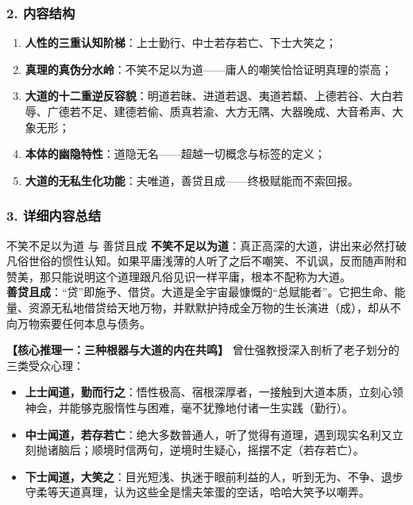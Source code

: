 \subsubsection{2. 内容结构}
\begin{enumerate}
    \item \textbf{人性的三重认知阶梯}：上士勤行、中士若存若亡、下士大笑之；
    \item \textbf{真理的真伪分水岭}：不笑不足以为道——庸人的嘲笑恰恰证明真理的崇高；
    \item \textbf{大道的十二重逆反容貌}：明道若昧、进道若退、夷道若纇、上德若谷、大白若辱、广德若不足、建德若偷、质真若渝、大方无隅、大器晚成、大音希声、大象无形；
    \item \textbf{本体的幽隐特性}：道隐无名——超越一切概念与标签的定义；
    \item \textbf{大道的无私生化功能}：夫唯道，善贷且成——终极赋能而不索回报。
\end{enumerate}

\subsubsection{3. 详细内容总结}

\begin{ConceptBox}{不笑不足以为道 与 善贷且成}
\textbf{不笑不足以为道}：真正高深的大道，讲出来必然打破凡俗世俗的惯性认知。如果平庸浅薄的人听了之后不嘲笑、不讥讽，反而随声附和赞美，那只能说明这个道理跟凡俗见识一样平庸，根本不配称为大道。\\
\textbf{善贷且成}：“贷”即施予、借贷。大道是全宇宙最慷慨的“总赋能者”。它把生命、能量、资源无私地借贷给天地万物，并默默护持成全万物的生长演进（成），却从不向万物索要任何本息与债务。
\end{ConceptBox}

\noindent\textbf{【核心推理一：三种根器与大道的内在共鸣】}
曾仕强教授深入剖析了老子划分的三类受众心理：
\begin{itemize}
    \item \textbf{上士闻道，勤而行之}：悟性极高、宿根深厚者，一接触到大道本质，立刻心领神会，并能够克服惰性与困难，毫不犹豫地付诸一生实践（勤行）。
    \item \textbf{中士闻道，若存若亡}：绝大多数普通人，听了觉得有道理，遇到现实名利又立刻抛诸脑后；顺境时信两句，逆境时生疑心，摇摆不定（若存若亡）。
    \item \textbf{下士闻道，大笑之}：目光短浅、执迷于眼前利益的人，听到无为、不争、退步守柔等天道真理，认为这些全是懦夫笨蛋的空话，哈哈大笑予以嘲弄。
\end{itemize}

